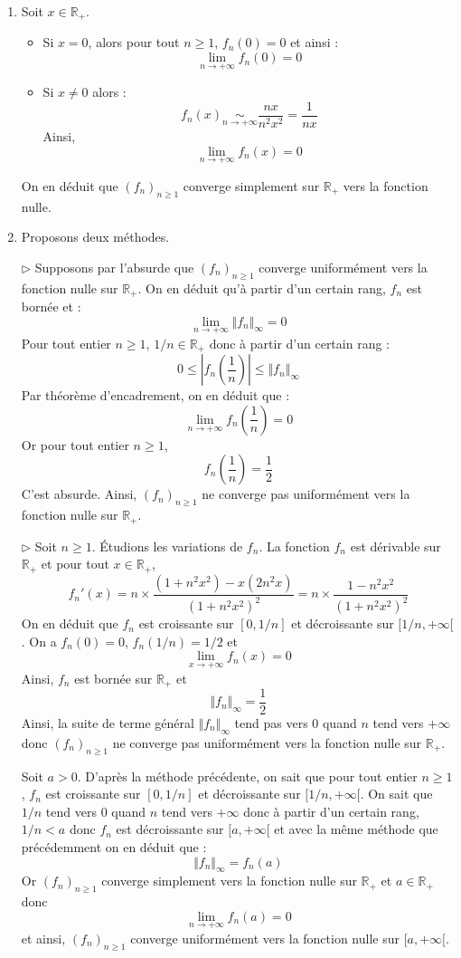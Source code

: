 \documentclass[a4paper,10pt]{report}
\begin{document}
\begin{enumerate}
\item Soit $x \in \mathbb{R}_+$.

\begin{itemize}
\item Si $x=0$, alors pour tout $n \geq 1$, $f_n(0)=0$ et ainsi :
$$ \lim_{n \rightarrow + \infty} f_n(0)=0$$
\item Si $x \neq 0$ alors :
$$ f_n(x) \underset{n \rightarrow + \infty}{\sim} \dfrac{nx}{n^2x^2} = \dfrac{1}{nx}$$
Ainsi,
$$ \lim_{n \rightarrow + \infty} f_n(x) = 0$$
\end{itemize}
On en déduit que $(f_n)_{n \geq 1}$ converge simplement sur $\mathbb{R}_+$ vers la fonction nulle.
\item Proposons deux méthodes.

\medskip

\noindent $\rhd$ Supposons par l'absurde que $(f_n)_{n \geq 1}$ converge uniformément vers la fonction nulle sur $\mathbb{R}_+$. On en déduit qu'à partir d'un certain rang, $f_n$ est bornée et :
$$ \lim_{n \rightarrow + \infty} \Vert f_n \Vert_{\infty} = 0$$
Pour tout entier $n \geq 1$, $1/n \in \mathbb{R}_+$ donc à partir d'un certain rang :
$$ 0 \leq \left\vert f_n \left( \dfrac{1}{n} \right) \right\vert \leq \Vert f_n \Vert_{\infty}$$
Par théorème d'encadrement, on en déduit que :
$$ \lim_{n \rightarrow + \infty} f_n \left( \dfrac{1}{n} \right) = 0$$
Or pour tout entier $n \geq 1$,
$$ f_n \left( \dfrac{1}{n} \right) = \dfrac{1}{2}$$
C'est absurde. Ainsi, $(f_n)_{n \geq 1}$ ne converge pas uniformément vers la fonction nulle sur $\mathbb{R}_+$.

\medskip

\noindent $\rhd$ Soit $n \geq 1$. Étudions les variations de $f_n$. La fonction $f_n$ est dérivable sur $\mathbb{R}_+$ et pour tout $x \in \mathbb{R}_+$,
$$ f_n'(x) = n \times \dfrac{(1+n^2x^2)-x(2n^2x)}{(1+n^2x^2)^2} = n \times \dfrac{1-n^2x^2}{(1+n^2x^2)^2}$$
On en déduit que $f_n$ est croissante sur $[0,1/n]$ et décroissante sur $[1/n, + \infty[$. On a $f_n(0)=0$, $f_n(1/n)=1/2$ et 
$$ \lim_{x \rightarrow + \infty} f_n(x) = 0$$
Ainsi, $f_n$ est bornée sur $\mathbb{R}_+$ et 
$$ \Vert f_n \Vert_{\infty} = \dfrac{1}{2}$$
Ainsi, la suite de terme général $\Vert f_n \Vert_{\infty}$ tend pas vers $0$ quand $n$ tend vers $+ \infty$ donc $(f_n)_{n \geq 1}$ ne converge pas uniformément vers la fonction nulle sur $\mathbb{R}_+$.

\medskip

\noindent Soit $a>0$. D'après la méthode précédente, on sait que pour tout entier $n \geq 1$, $f_n$ est croissante sur $[0,1/n]$ et décroissante sur $[1/n, + \infty[$. On sait que $1/n$ tend vers $0$ quand $n$ tend vers $+ \infty$ donc à partir d'un certain rang, $1/n<a$ donc $f_n$ est décroissante sur $[a, + \infty[$ et avec la même méthode que précédemment on en déduit que :
$$  \Vert f_n \Vert_{\infty} = f_n(a)$$
Or $(f_n)_{n \geq 1}$ converge simplement vers la fonction nulle sur $\mathbb{R}_+$ et $a \in \mathbb{R}_+$ donc 
$$ \lim_{n \rightarrow + \infty} f_n(a) = 0$$
et ainsi, $(f_n)_{n \geq 1}$ converge uniformément vers la fonction nulle sur $[a, + \infty[$.

\end{enumerate}
\end{document}
